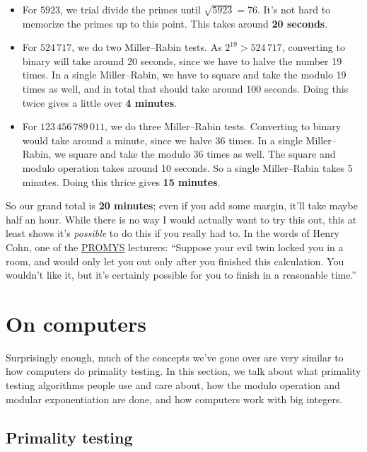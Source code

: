 \documentclass[11pt,paper=letter]{scrartcl}
\begin{document}
\begin{itemize}
  \item For $5923$, we trial divide the primes until $\sqrt{5923} = 76$. It's not hard to memorize the primes up to this point. This takes around \textbf{20 seconds}.

  \item For $524\,717$, we do two Miller--Rabin tests. As $2^{19} > 524\,717$, converting to binary will take around 20 seconds, since we have to halve the number 19 times. In a single Miller--Rabin, we have to square and take the modulo 19 times as well, and in total that should take around 100 seconds. Doing this twice gives a little over \textbf{4 minutes}.

  \item For $123\,456\,789\,011$, we do three Miller--Rabin tests. Converting to binary would take around a minute, since we halve 36 times. In a single Miller--Rabin, we square and take the modulo 36 times as well. The square and modulo operation takes around 10 seconds. So a single Miller--Rabin takes 5 minutes. Doing this thrice gives \textbf{15 minutes}.
\end{itemize}

So our grand total is \textbf{20 minutes}; even if you add some margin, it'll take maybe half an hour. While there is no way I would actually want to try this out, this at least shows it's \emph{possible} to do this if you really had to. In the words of Henry Cohn, one of the \href{https://promys.org}{PROMYS} lecturers: ``Suppose your evil twin locked you in a room, and would only let you out only after you finished this calculation. You wouldn't like it, but it's certainly possible for you to finish in a reasonable time.''

\section{On computers}

Surprisingly enough, much of the concepts we've gone over are very similar to how computers do primality testing. In this section, we talk about what primality testing algorithms people use and care about, how the modulo operation and modular exponentiation are done, and how computers work with big integers.

\subsection{Primality testing}
\end{document}
